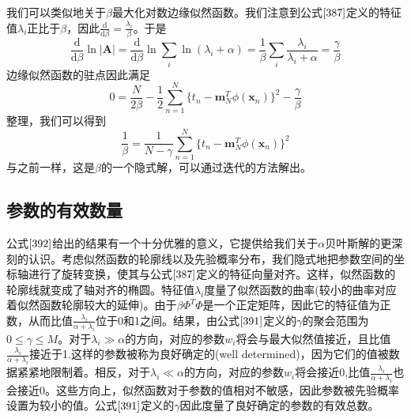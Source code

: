 我们可以类似地关于$\beta$最大化对数边缘似然函数。我们注意到公式$\ref{387}$定义的特征值$\lambda_i$正比于$\beta$，因此$\frac{\mathrm{d}}{\mathrm{d}\beta}=\frac{\lambda_i}{\beta}$。于是
\begin{equation}
	\frac{\mathrm{d}}{\mathrm{d} \beta}\ln |\boldsymbol{A}|=\frac{\mathrm{d}}{\mathrm{d} \beta}\ln \sum_{i}\ln (\lambda_i+\alpha)=\frac{1}{\beta}\sum_i\frac{\lambda_i}{\lambda_i+\alpha}=\frac{\gamma}{\beta}
\end{equation}
边缘似然函数的驻点因此满足
\begin{equation}
	0=\frac{N}{2\beta}-\frac{1}{2}\sum_{n=1}^{N}\{t_n-\boldsymbol{m}_N^T\phi(\boldsymbol{x}_n) \}^2-\frac{\gamma}{\beta}
\end{equation}
整理，我们可以得到 
\begin{equation}
\label{395}
	\frac{1}{\beta}=\frac{1}{N-\gamma}\sum_{n=1}^{N}\{t_n-\boldsymbol{m}_N^T\phi(\boldsymbol{x}_n) \}^2
\end{equation}
与之前一样，这是$\beta$的一个隐式解，可以通过迭代的方法解出。
\subsection*{参数的有效数量}
公式$\ref{392}$给出的结果有一个十分优雅的意义，它提供给我们关于$\alpha$贝叶斯解的更深刻的认识。考虑似然函数的轮廓线以及先验概率分布，我们隐式地把参数空间的坐标轴进行了旋转变换，使其与公式$\ref{387}$定义的特征向量对齐。这样，似然函数的轮廓线就变成了轴对齐的椭圆。特征值$\lambda_i$度量了似然函数的曲率(较小的曲率对应着似然函数轮廓较大的延伸)。由于$\beta\Phi^T\Phi$是一个正定矩阵，因此它的特征值为正数，从而比值$\frac{\lambda_i}{\alpha +\lambda_i}$位于0和1之间。结果，由公式$\ref{391}$定义的$\gamma$的聚会范围为$0\leqslant \gamma \leqslant M$。对于$\lambda_i \gg \alpha$的方向，对应的参数$w_i$将会与最大似然值接近，且比值$\frac{\lambda_i}{\alpha +\lambda_i}$接近于1.这样的参数被称为良好确定的(well determined)，因为它们的值被数据紧紧地限制着。相反，对于$\lambda_i\ll \alpha$的方向，对应的参数$w_i$将会接近0,比值$\frac{\lambda_i}{\alpha +\lambda_i}$也会接近0。这些方向上，似然函数对于参数的值相对不敏感，因此参数被先验概率设置为较小的值。公式$\ref{391}$定义的$\gamma$因此度量了良好确定的参数的有效总数。

